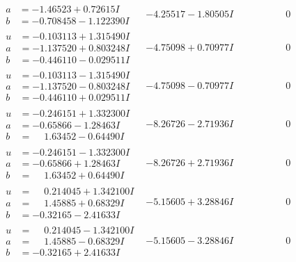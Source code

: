 \documentclass[1p]{elsarticle_modified}
\theoremstyle{definition}
\begin{document}
$$\begin{array}{c|c|c}
\begin{aligned}
a &= -1.46523 + 0.72615 I \\
b &= -0.708458 - 1.122390 I\end{aligned}
 & -4.25517 - 1.80505 I & \phantom{-0.000000 } 0 \\ \hline\begin{aligned}
u &= -0.103113 + 1.315490 I \\
a &= -1.137520 + 0.803248 I \\
b &= -0.446110 - 0.029511 I\end{aligned}
 & -4.75098 + 0.70977 I & \phantom{-0.000000 } 0 \\ \hline\begin{aligned}
u &= -0.103113 - 1.315490 I \\
a &= -1.137520 - 0.803248 I \\
b &= -0.446110 + 0.029511 I\end{aligned}
 & -4.75098 - 0.70977 I & \phantom{-0.000000 } 0 \\ \hline\begin{aligned}
u &= -0.246151 + 1.332300 I \\
a &= -0.65866 - 1.28463 I \\
b &= \phantom{-}1.63452 - 0.64490 I\end{aligned}
 & -8.26726 - 2.71936 I & \phantom{-0.000000 } 0 \\ \hline\begin{aligned}
u &= -0.246151 - 1.332300 I \\
a &= -0.65866 + 1.28463 I \\
b &= \phantom{-}1.63452 + 0.64490 I\end{aligned}
 & -8.26726 + 2.71936 I & \phantom{-0.000000 } 0 \\ \hline\begin{aligned}
u &= \phantom{-}0.214045 + 1.342100 I \\
a &= \phantom{-}1.45885 + 0.68329 I \\
b &= -0.32165 - 2.41633 I\end{aligned}
 & -5.15605 + 3.28846 I & \phantom{-0.000000 } 0 \\ \hline\begin{aligned}
u &= \phantom{-}0.214045 - 1.342100 I \\
a &= \phantom{-}1.45885 - 0.68329 I \\
b &= -0.32165 + 2.41633 I\end{aligned}
 & -5.15605 - 3.28846 I & \phantom{-0.000000 } 0 \\ \hline\begin{aligned}

\end{aligned}
\end{array}$$
\end{document}
